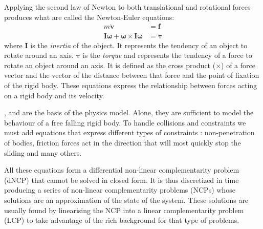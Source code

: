 Applying the second law of Newton to both translational and rotational forces produces what are called the Newton-Euler equations:
\begin{align}
m\dot{\mathbf{v}} &= \mathbf{f} \label{eq:newton1}\\
\mathbf{I}\dot{\boldsymbol{\omega}} + \boldsymbol{\omega} \times \mathbf{I}\boldsymbol{\omega} &= \boldsymbol{\tau} \label{eq:newton2}
\end{align}
where $\mathbf{I}$ is the \emph{inertia} of the object. It represents the tendency of an object to rotate around an axis. $\boldsymbol{\tau}$ is the \emph{torque} and represents the tendency of a force to rotate an object around an axis. It is defined as the cross product ($\times$) of a force vector and the vector of the distance between that force and the point of fixation of the rigid body. These equations express the relationship between forces acting on a rigid body and its velocity.

,  and  are the basis of the physics model. Alone, they are sufficient to model the behaviour of a free falling rigid body. To handle collisions and constraints we must add equations that express different types of constraints : non-penetration of bodies, friction forces act in the direction that will most quickly stop the sliding and many others. 

All these equations form a differential non-linear complementarity problem (dNCP) that cannot be solved in closed form. It is thus discretized in time producing a series of non-linear complementarity problems (NCPs) whose solutions are an approximation of the state of the system. These solutions are usually found by linearising the NCP into a linear complementarity problem (LCP) to take advantage of the rich background for that type of problems. 
%

